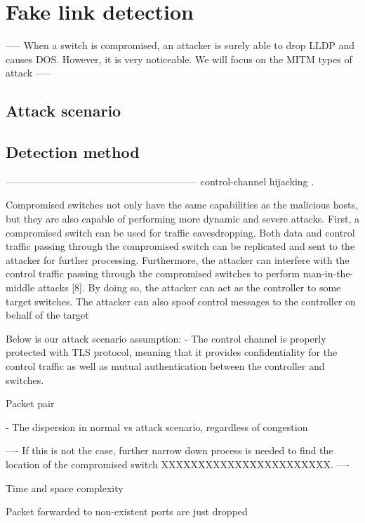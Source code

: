 \section{Fake link detection}

-----
When a switch is compromised, an attacker is surely able to drop LLDP and causes DOS. However, it is very noticeable. We will focus on the MITM types of attack
-----
\subsection{Attack scenario}
\subsection{Detection method}


-----------------------------------------------------------
control-channel hijacking \cite{AAS14}. 

Compromised switches not only have the same capabilities as the malicious hosts, but they are also capable of performing more dynamic and severe attacks.
First, a compromised switch can be used for traffic eavesdropping. Both data and control traffic passing through the compromised switch can be replicated and sent to the attacker for further processing. Furthermore, the attacker can interfere with the control traffic passing through the compromised
switches to perform man-in-the-middle attacks [8]. By doing so, the
attacker can act as the controller to some target switches. The attacker can
also spoof control messages to the controller on behalf of the target

Below is our attack scenario assumption: 
- The control channel is properly protected with TLS protocol, meaning
that it provides confidentiality for the control traffic as well as mutual
authentication between the controller and switches.

Packet pair

- The dispersion in normal vs attack scenario, regardless of congestion

----
If this is not the case, further narrow down process is needed to find the location of the compromised switch XXXXXXXXXXXXXXXXXXXXXXX.
----

Time and space complexity


Packet forwarded to non-existent ports are just dropped


